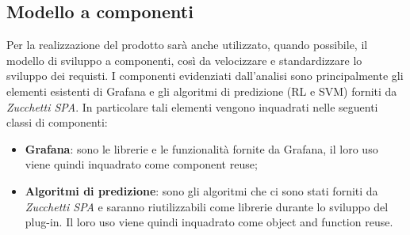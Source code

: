 \subsection{Modello a componenti}
Per la realizzazione del prodotto sarà anche utilizzato, quando possibile, il modello di sviluppo a componenti, così da velocizzare e standardizzare lo
sviluppo dei requisti. I componenti evidenziati dall’analisi sono principalmente
gli elementi esistenti di Grafana e gli algoritmi di predizione (RL e SVM) forniti
da \textit{Zucchetti SPA}. In particolare tali elementi vengono inquadrati nelle seguenti classi di componenti: \begin{itemize}
\item \textbf{Grafana}: sono le librerie e le funzionalità fornite da Grafana, il loro uso viene quindi inquadrato come component reuse;
\item \textbf{Algoritmi di predizione}: sono gli algoritmi che ci sono stati forniti da \textit{Zucchetti SPA} e saranno riutilizzabili come librerie durante lo sviluppo del plug-in. Il loro uso viene quindi inquadrato come object and
function reuse.
\end{itemize}